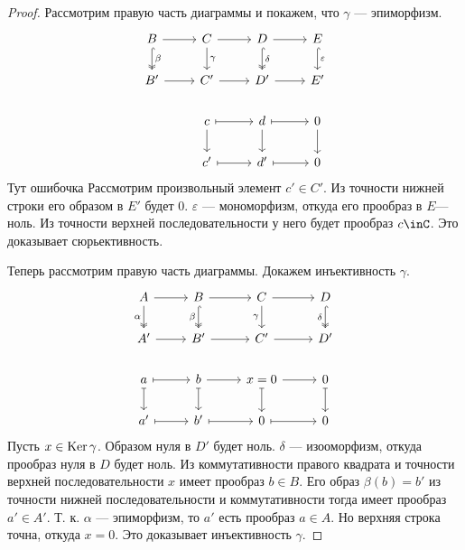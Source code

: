 \documentclass[../main.tex]{subfiles}
\begin{document}
\begin{proof}
Рассмотрим правую часть диаграммы и покажем, что $\gamma$ --- эпиморфизм.
\begin{equation*}
    \begin{tikzcd}
	B & C & D & E \\
	{B'} & {C'} & {D'} & {E'} \\
	& c & d & 0 \\
	& {c'} & {d'} & 0
	\arrow["\beta", hook, two heads, from=1-1, to=2-1]
	\arrow["\gamma", from=1-2, to=2-2]
	\arrow["\delta", hook, two heads, from=1-3, to=2-3]
	\arrow["\varepsilon", hook, from=1-4, to=2-4]
	\arrow[from=1-1, to=1-2]
	\arrow[from=1-2, to=1-3]
	\arrow[from=1-3, to=1-4]
	\arrow[from=2-1, to=2-2]
	\arrow[from=2-2, to=2-3]
	\arrow[from=2-3, to=2-4]
	\arrow[maps to, from=4-2, to=4-3]
	\arrow[maps to, from=4-3, to=4-4]
	\arrow[from=3-4, to=4-4]
	\arrow[maps to, from=3-2, to=3-3]
	\arrow[maps to, from=3-3, to=3-4]
	\arrow[from=3-3, to=4-3]
	\arrow[from=3-2, to=4-2]
\end{tikzcd}
\end{equation*}{\color{red} Тут ошибочка}
Рассмотрим произвольный элемент $c'\in C'$. Из точности нижней строки его образом в $E'$ будет $0$. $\varepsilon$ --- мономорфизм, откуда его прообраз в $E$--- ноль. Из точности верхней последовательности у него будет прообраз $c\inC$. Это доказывает сюрьективность.

Теперь рассмотрим правую часть диаграммы. Докажем инъективность $\gamma$.
\begin{equation*}
    \begin{tikzcd}
	A & B & C & D \\
	{A'} & {B'} & {C'} & {D'} \\
	a & b & {x=0} & 0 \\
	{a'} & {b'} & 0 & 0
	\arrow["\alpha"', two heads, from=1-1, to=2-1]
	\arrow["\beta"', hook, two heads, from=1-2, to=2-2]
	\arrow["\gamma"', from=1-3, to=2-3]
	\arrow["\delta"', hook, two heads, from=1-4, to=2-4]
	\arrow[from=1-1, to=1-2]
	\arrow[from=1-2, to=1-3]
	\arrow[from=1-3, to=1-4]
	\arrow[from=2-1, to=2-2]
	\arrow[from=2-2, to=2-3]
	\arrow[from=2-3, to=2-4]
	\arrow[maps to, from=4-2, to=4-3]
	\arrow[maps to, from=4-1, to=4-2]
	\arrow[maps to, from=3-1, to=4-1]
	\arrow[maps to, from=3-1, to=3-2]
	\arrow[maps to, from=3-2, to=4-2]
	\arrow[from=3-2, to=3-3]
	\arrow[maps to, from=3-3, to=4-3]
	\arrow[maps to, from=4-3, to=4-4]
	\arrow[maps to, from=3-4, to=4-4]
	\arrow[from=3-3, to=3-4]
\end{tikzcd}
\end{equation*}
Пусть $x\in \mathop{\mathrm{Ker}}\nolimits\gamma$. Образом нуля в $D'$ будет ноль. $\delta$ --- изооморфизм, откуда прообраз нуля в $D$ будет ноль. Из коммутативности правого квадрата и точности верхней последовательности $x$ имеет прообраз $b\in B$. Его образ $\beta(b) = b'$ из точности нижней последовательности и коммутативности тогда имеет прообраз $a'\in A'$. Т. к. $\alpha$ --- эпиморфизм, то $a'$ есть прообраз $a\in A$. Но верхняя строка точна, откуда $x=0$. Это доказывает инъективность $\gamma$.
\end{proof}
\end{document}
